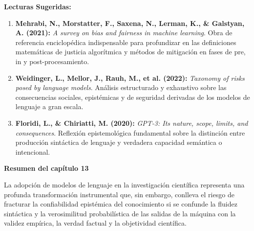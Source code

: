 \textbf{Lecturas Sugeridas:}\\[0.2cm]
\begin{enumerate}
    \item \textbf{Mehrabi, N., Morstatter, F., Saxena, N., Lerman, K., \& Galstyan, A. (2021):} \textit{A survey on bias and fairness in machine learning}. Obra de referencia enciclopédica indispensable para profundizar en las definiciones matemáticas de justicia algorítmica y métodos de mitigación en fases de pre, in y post-procesamiento.
    \item \textbf{Weidinger, L., Mellor, J., Rauh, M., et al. (2022):} \textit{Taxonomy of risks posed by language models}. Análisis estructurado y exhaustivo sobre las consecuencias sociales, epistémicas y de seguridad derivadas de los modelos de lenguaje a gran escala.
    \item \textbf{Floridi, L., \& Chiriatti, M. (2020):} \textit{GPT-3: Its nature, scope, limits, and consequences}. Reflexión epistemológica fundamental sobre la distinción entre producción sintáctica de lenguaje y verdadera capacidad semántica o intencional.
\end{enumerate}

\newpage
{}
\vspace*{0.8cm}
{\Huge \textbf{Resumen del capítulo 13}}
\vspace{0.8cm}

La adopción de modelos de lenguaje en la investigación científica representa una profunda transformación instrumental que, sin embargo, conlleva el riesgo de fracturar la confiabilidad epistémica del conocimiento si se confunde la fluidez sintáctica y la verosimilitud probabilística de las salidas de la máquina con la validez empírica, la verdad factual y la objetividad científica.

\vspace{0.4cm}

